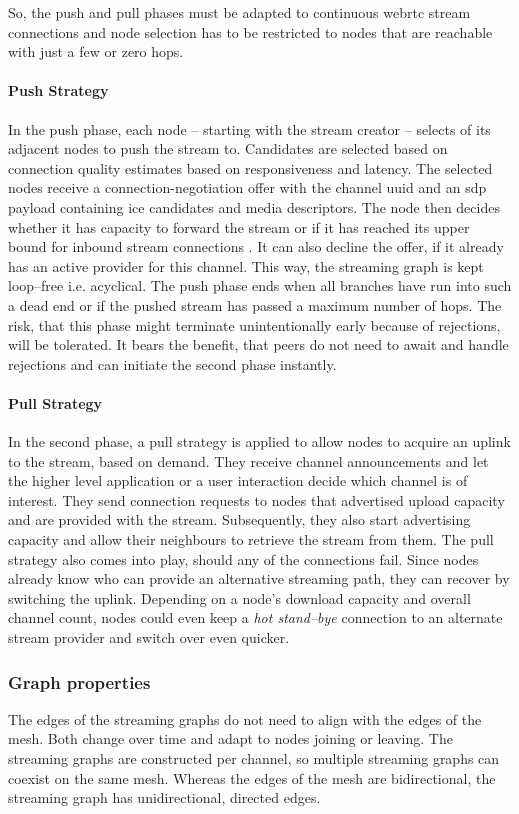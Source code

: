 So, the push and pull phases must be adapted to continuous \gls{webrtc} stream connections and node selection has to be restricted to nodes that are reachable with just a few or zero hops.

\paragraph{Push Strategy}\label{par:design-stream-construction-push}
In the push phase, each node – starting with the stream creator – selects \outStreamConnections of its adjacent nodes to push the stream to. Candidates are selected based on connection quality estimates based on responsiveness and latency. The selected nodes receive a \gls{connection-negotiation} offer with the channel \gls{uuid} and an \gls{sdp} payload containing \gls{ice} candidates and media descriptors. The node then decides whether it has capacity to forward the stream or if it has reached its upper bound for inbound stream connections \inStreamConnections. It can also decline the offer, if it already has an active provider for this channel. This way, the streaming graph is kept loop–free i.e. acyclical. The push phase ends when all branches have run into such a dead end or if the pushed stream has passed a maximum number of hops. The risk, that this phase might terminate unintentionally early because of rejections, will be tolerated. It bears the benefit, that peers do not need to await and handle rejections and can initiate the second phase instantly.

\paragraph{Pull Strategy}\label{par:design-stream-construction-pull}
In the second phase, a pull strategy is applied to allow nodes to acquire an uplink to the stream, based on demand. They receive channel announcements and let the higher level application or a user interaction decide which channel is of interest. They send connection requests to nodes that advertised upload capacity and are provided with the stream. Subsequently, they also start advertising capacity and allow their neighbours to retrieve the stream from them. The pull strategy also comes into play, should any of the connections fail. Since nodes already know who can provide an alternative streaming path, they can recover by switching the uplink. Depending on a node's download capacity and overall channel count, nodes could even keep a \textit{hot stand–bye} connection to an alternate stream provider and switch over even quicker.

\subsubsection{Graph properties}\label{sec:design-stream-graph}

The edges of the streaming graphs do not need to align with the edges of the mesh. Both change over time and adapt to nodes joining or leaving. The streaming graphs are constructed per channel, so multiple streaming graphs can coexist on the same mesh. Whereas the edges of the mesh are bidirectional, the streaming graph has unidirectional, directed edges.
